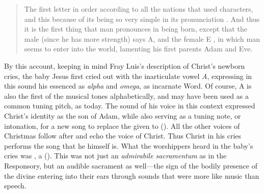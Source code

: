 \begin{quote}
The first letter in order according to all the nations that used characters,
\Dots{} and this because of its being so very simple in its pronunciation
. \Dots{} 
    And thus it is the first thing that man pronounces in
being born, except that the male (since he has more strength) says A, and the
female E , in which man seems to enter into the world,
lamenting his first parents Adam and Eve.%
\Autocites
    [:
    .]
    {Covarrubias:Tesoro}
    [On symbolic alphabets in early modern devotional music, see][38--40]
    {Kendrick:Jeremiah}
\end{quote}
By this account, keeping in mind Fray Luis's description of Christ's newborn
cries, the baby Jesus first cried out with the inarticulate vowel \emph{A},
expressing in this sound his essenced as \emph{alpha} and \emph{omega}, as
incarnate Word.
Of course, A is also the first of the musical tones alphabetically, and may have
been used as a common tuning pitch, as today.
The sound of his voice in this context expressed Christ's identity as the son of
Adam, while also serving as a tuning note, or intonation, for a new song to
replace the  given to 
().
All the other voices of Christmas follow after and echo the voice of Christ.
Thus Christ in his cries performs the song that he himself is.
What the worshippers heard in the baby's cries was , a  ().
This was not just an \emph{admirabile sacramentum} as in the Responsory, but an
audible sacrament as well---the sign of the bodily presence of the divine
entering into their ears through sounds that were more like music than speech.

